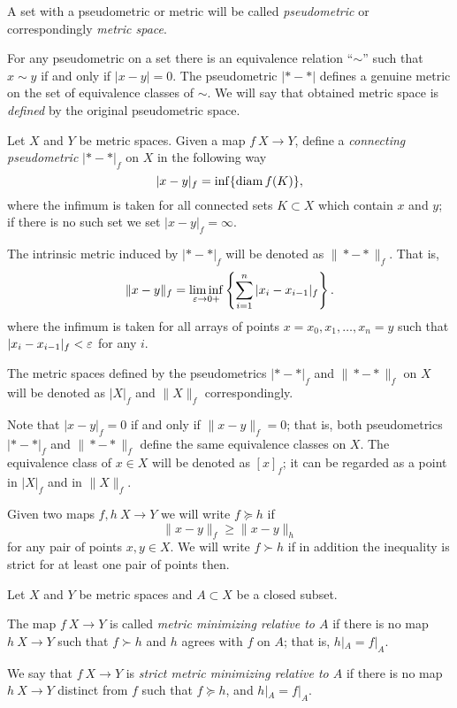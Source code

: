 \documentclass[a4paper,10pt]{amsart}
\begin{document}
A set with a pseudometric or metric will be called \emph{pseudometric} or correspondingly \emph{metric space}.

For any pseudometric on a set 
there is an equivalence relation ``$\sim$''
such that $x\sim y$ if and only if $|x-y|=0$.
The pseudometric $|{*}-{*}|$ defines a genuine metric on the set of equivalence classes of $\sim$.
We will say that obtained metric space is \emph{defined} by the  original pseudometric space.%

Let $X$ and $Y$ be metric spaces.
Given a map $f\:X\to Y$,
define a \emph{connecting pseudometric} $|{*}-{*}|_f$ on $X$ in
the following way
\[|x-y|_f=\inf\{\mathop{\rm diam}\nolimits f(K)\},\]
where the infimum is taken for all connected sets $K\subset X$ which contain $x$ and $y$;
if there is no such set we set $|x-y|_f=\infty$.

The intrinsic metric induced by $|{*}-{*}|_f$ will be denoted as 
$\|{*}-{*}\|_f$. 
That is, 
\[\|x-y\|_f=\liminf_{\varepsilon\to0+}\left\{\sum_{i=1}^n|x_i-x_{i-1}|_f\right\}.\]
where the infimum is taken for all arrays of points 
$x=x_0,x_1,\dots,x_n=y$ such that 
$|x_i-x_{i-1}|_f<\varepsilon$ for any $i$.

The metric spaces defined by the pseudometrics $|{*}-{*}|_f$ 
and $\|{*}-{*}\|_f$ on $X$ will be denoted as $|X|_f$ and $\|X\|_f$ correspondingly.

Note that $|x-y|_f=0$ if and only if $\|x-y\|_f=0$;
that is,  both pseudometrics $|{*}-{*}|_f$ and  $\|{*}-{*}\|_f$
define the same equivalence classes on $X$.
The equivalence class of $x\in X$ will be denoted as $[x]_f$; 
it can be regarded as a point in  $|X|_f$ and in $\|X\|_f$.

Given two maps $f,h\:X\to Y$ we will write $f\succcurlyeq h$ if 
\[\|x-y\|_f\ge \|x-y\|_h\]
for any pair of points $x,y\in X$.
We will write $f\succ h$ 
if in addition the inequality is strict for at least one pair of points then.



Let $X$ and $Y$ be metric spaces and $A\subset X$ be a closed subset.

The map $f\:X\to Y$ is called \emph{metric minimizing relative to $A$}
if there is no map $h\:X\to Y$ such that $f\succ h$
and $h$ agrees with $f$ on $A$;
that is, $h|_A=f|_A$.

We say that $f\:X\to Y$ is \emph{strict metric minimizing relative to $A$}
if there is no map $h\:X\to Y$ distinct from $f$
such that $f\succcurlyeq h$, 
and $h|_A=f|_A$.
\end{document}
